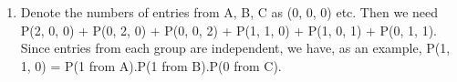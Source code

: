 \documentclass[a4paper,12pt]{article}
\begin{document}
\begin{enumerate}
\begin{table}[ht!]
\begin{tabular}{|p{15cm}|}
\\ \hline
      
\end{tabular}
    
\end{table}


\item  Denote the numbers of entries from A, B, C as (0, 0, 0) etc. Then we need P(2, 0, 0) + P(0, 2, 0) + P(0, 0, 2) + P(1, 1, 0) + P(1, 0, 1) + P(0, 1, 1). Since entries from each group are independent, we have, as an example, P(1, 1, 0) = P(1 from A).P(1 from B).P(0 from C).
\end{enumerate}
\end{document}
